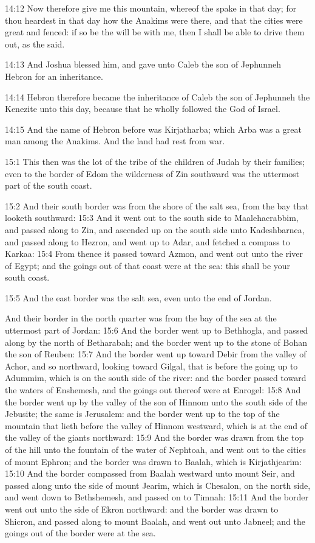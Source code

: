 14:12 Now therefore give me this mountain, whereof the \LORD spake in that day; for thou heardest in that day how the Anakims were there, and that the cities were great and fenced: if so be the \LORD will be with me, then I shall be able to drive them out, as the \LORD said.

14:13 And Joshua blessed him, and gave unto Caleb the son of Jephunneh Hebron for an inheritance.

14:14 Hebron therefore became the inheritance of Caleb the son of Jephunneh the Kenezite unto this day, because that he wholly followed the \LORD God of Israel.

14:15 And the name of Hebron before was Kirjatharba; which Arba was a great man among the Anakims. And the land had rest from war.

15:1 This then was the lot of the tribe of the children of Judah by their families; even to the border of Edom the wilderness of Zin southward was the uttermost part of the south coast.

15:2 And their south border was from the shore of the salt sea, from the bay that looketh southward: 15:3 And it went out to the south side to Maalehacrabbim, and passed along to Zin, and ascended up on the south side unto Kadeshbarnea, and passed along to Hezron, and went up to Adar, and fetched a compass to Karkaa: 15:4 From thence it passed toward Azmon, and went out unto the river of Egypt; and the goings out of that coast were at the sea: this shall be your south coast.

15:5 And the east border was the salt sea, even unto the end of Jordan.

And their border in the north quarter was from the bay of the sea at the uttermost part of Jordan: 15:6 And the border went up to Bethhogla, and passed along by the north of Betharabah; and the border went up to the stone of Bohan the son of Reuben: 15:7 And the border went up toward Debir from the valley of Achor, and so northward, looking toward Gilgal, that is before the going up to Adummim, which is on the south side of the river: and the border passed toward the waters of Enshemesh, and the goings out thereof were at Enrogel: 15:8 And the border went up by the valley of the son of Hinnom unto the south side of the Jebusite; the same is Jerusalem: and the border went up to the top of the mountain that lieth before the valley of Hinnom westward, which is at the end of the valley of the giants northward: 15:9 And the border was drawn from the top of the hill unto the fountain of the water of Nephtoah, and went out to the cities of mount Ephron; and the border was drawn to Baalah, which is Kirjathjearim: 15:10 And the border compassed from Baalah westward unto mount Seir, and passed along unto the side of mount Jearim, which is Chesalon, on the north side, and went down to Bethshemesh, and passed on to Timnah: 15:11 And the border went out unto the side of Ekron northward: and the border was drawn to Shicron, and passed along to mount Baalah, and went out unto Jabneel; and the goings out of the border were at the sea.

